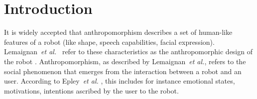 \documentclass[a4,twocolumn,10pt]{article}
\newcommand{\etal}{{\textit{et al.\xspace}}}
\begin{document}
\begin{abstract}
%
%

\end{abstract}


\section{Introduction}

It is widely accepted that anthropomorphism describes a set of human-like
features of a robot (like shape, speech capabilities, facial expression).
Lemaignan~\etal~\cite{lemaignan2014dynamics}  refer to these characteristics as the
anthropomorphic design of the robot .  Anthropomorphism, as described by
Lemaignan~\etal, refers to the social phenomenon that emerges from the
interaction between a robot and an user. According to Epley~\etal
\cite{epley_when_2008},
this includes for instance emotional states, motivations, intentions ascribed by
the user to the robot. 
\end{document}
